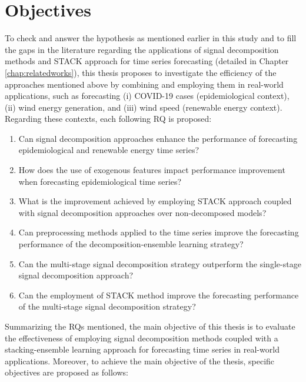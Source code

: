 \section{Objectives} \label{sec:objectives}
To check and answer the hypothesis as mentioned earlier in this study and to fill the gaps in the literature regarding the applications of signal decomposition methods and \ac{STACK} approach for time series forecasting (detailed in Chapter \ref{chap:relatedworks}), this thesis proposes to investigate the efficiency of the approaches mentioned above by combining and employing them in real-world applications, such as forecasting (i) \ac{COVID-19} cases (epidemiological context), (ii) wind energy generation, and (iii) wind speed (renewable energy context). Regarding these contexts, each following \ac{RQ} is proposed:


\begin{enumerate}[start=1, label={\textbf{\ac{RQ} \arabic*}}, wide=0pt, leftmargin=3em]
    \item \label{rq1} Can signal decomposition approaches enhance the performance of forecasting epidemiological and renewable energy time series?

    \item \label{rq2} How does the use of exogenous features impact performance improvement when forecasting epidemiological time series?

    \item \label{rq3} What is the improvement achieved by employing \ac{STACK} approach coupled with signal decomposition approaches over non-decomposed models?

    \item \label{rq4} Can preprocessing methods applied to the time series improve the forecasting performance of the decomposition-ensemble learning strategy?

    \item \label{rq5} Can the multi-stage signal decomposition strategy outperform the single-stage signal decomposition approach?

    \item \label{rq6} Can the employment of \ac{STACK} method improve the forecasting performance of the multi-stage signal decomposition strategy?
\end{enumerate}

Summarizing the \ac{RQ}s mentioned, the main objective of this thesis is to evaluate the effectiveness of employing signal decomposition methods coupled with a stacking-ensemble learning approach for forecasting time series in real-world applications. Moreover, to achieve the main objective of the thesis, specific objectives are proposed as follows:

